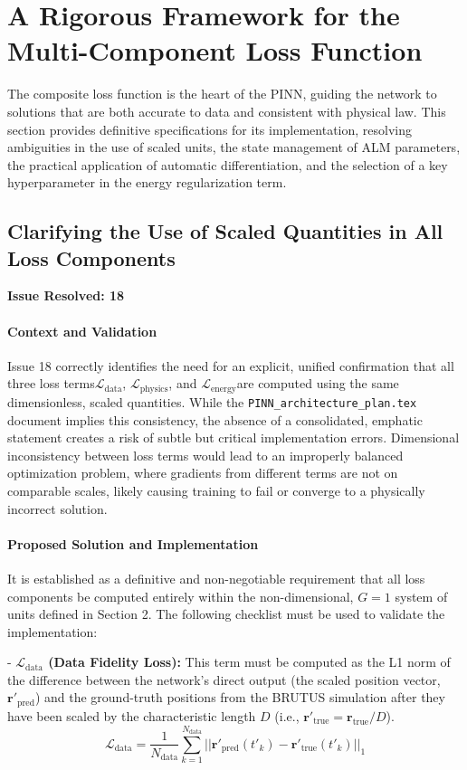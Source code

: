 \section{A Rigorous Framework for the Multi-Component Loss Function}
The composite loss function is the heart of the PINN, guiding the network to solutions that are both accurate to data and consistent with physical law. This section provides definitive specifications for its implementation, resolving ambiguities in the use of scaled units, the state management of ALM parameters, the practical application of automatic differentiation, and the selection of a key hyperparameter in the energy regularization term.

\subsection{Clarifying the Use of Scaled Quantities in All Loss Components}
\textbf{Issue Resolved: 18}
\paragraph{Context and Validation}
Issue 18 correctly identifies the need for an explicit, unified confirmation that all three loss terms\textemdash$\mathcal{L}_{\text{data}}$, $\mathcal{L}_{\text{physics}}$, and $\mathcal{L}_{\text{energy}}$\textemdash are computed using the same dimensionless, scaled quantities. While the \texttt{PINN\_architecture\_plan.tex} document implies this consistency, the absence of a consolidated, emphatic statement creates a risk of subtle but critical implementation errors. Dimensional inconsistency between loss terms would lead to an improperly balanced optimization problem, where gradients from different terms are not on comparable scales, likely causing training to fail or converge to a physically incorrect solution.

\paragraph{Proposed Solution and Imple\-mentation}
It is established as a definitive and non-negotiable requirement that all loss components be computed entirely within the non-dimensional, $G=1$ system of units defined in Section 2. The following checklist must be used to validate the implementation:


- \textbf{$\mathcal{L}_{\text{data}}$ (Data Fidelity Loss):} This term must be computed as the L1 norm of the difference between the network's direct output (the scaled position vector, $\mathbf{r}'_{\text{pred}}$) and the ground-truth positions from the BRUTUS simulation after they have been scaled by the characteristic length $D$ (i.e., $\mathbf{r}'_{\text{true}} = \mathbf{r}_{\text{true}} / D$).
    \begin{equation}
        \mathcal{L}_{\text{data}} = \frac{1}{N_{\text{data}}} \sum_{k=1}^{N_{\text{data}}} ||\mathbf{r}'_{\text{pred}}(t'_k) - \mathbf{r}'_{\text{true}}(t'_k)||_1
    \end{equation}

